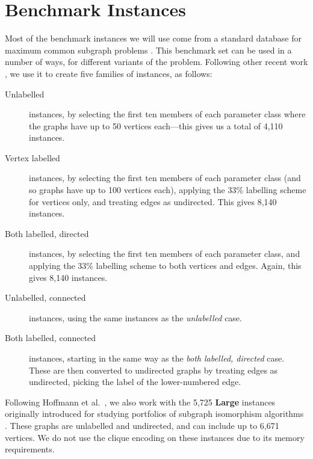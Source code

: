 \documentclass{llncs}
\begin{document}
\section{Benchmark Instances}

Most of the benchmark instances we will use come from a standard database for maximum common
subgraph problems \cite{DBLP:journals/prl/SantoFSV03,DBLP:journals/jgaa/ConteFV07}. This benchmark
set can be used in a number of ways, for different variants of the problem. Following other recent
work \cite{DBLP:conf/cp/McCreeshNPS16,DBLP:conf/aaai/HoffmannMR17,o:McCreeshPT17}, we use it to
create five families of instances, as follows:

\begin{description}
    \item[Unlabelled] instances, by selecting the first ten members of each parameter class where the
        graphs have up to 50 vertices each---this gives us a total of 4,110 instances.

    \item[Vertex labelled] instances, by selecting the first ten members of each parameter class
        (and so graphs have up to 100 vertices each), applying the 33\% labelling scheme for
        vertices only, and treating edges as undirected. This gives 8,140 instances.

    \item[Both labelled, directed] instances, by selecting the first ten members of each parameter
        class, and applying the 33\% labelling scheme to both vertices and edges. Again, this gives
        8,140 instances.

    \item[Unlabelled, connected] instances, using the same instances as the \emph{unlabelled} case.

    \item[Both labelled, connected] instances, starting in the same way as the \emph{both labelled,
        directed} case. These are then converted to undirected graphs by treating edges as
        undirected, picking the label of the lower-numbered edge.
\end{description}

\noindent
Following Hoffmann et al.\ \cite{DBLP:conf/aaai/HoffmannMR17}, we also work with the 5,725 \textbf{Large} instances
originally introduced for studying portfolios of subgraph isomorphism algorithms
\cite{DBLP:conf/lion/KotthoffMS16}. These graphs are unlabelled and undirected, and can include up
to 6,671 vertices. We do not use the clique encoding on these instances due to its
memory requirements.
\end{document}
